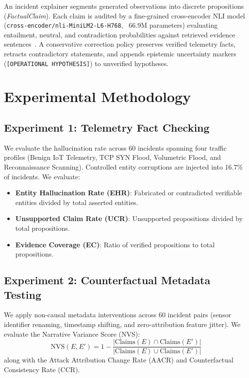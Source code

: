 \documentclass[conference]{IEEEtran}
\begin{document}
An incident explainer segments generated observations into discrete propositions (\textit{FactualClaim}). Each claim is audited by a fine-grained cross-encoder NLI model (\texttt{cross-encoder/nli-MiniLM2-L6-H768}, ~66.9M parameters) evaluating entailment, neutral, and contradiction probabilities against retrieved evidence sentences~\cite{thorne2018fever,devlin2019bert}. A conservative correction policy preserves verified telemetry facts, retracts contradictory statements, and appends epistemic uncertainty markers (\texttt{[OPERATIONAL HYPOTHESIS]}) to unverified hypotheses.

\section{Experimental Methodology}

\subsection{Experiment 1: Telemetry Fact Checking}
We evaluate the hallucination rate across 60 incidents spanning four traffic profiles (Benign IoT Telemetry, TCP SYN Flood, Volumetric Flood, and Reconnaissance Scanning). Controlled entity corruptions are injected into 16.7\% of incidents. We evaluate:
\begin{itemize}
    \item \textbf{Entity Hallucination Rate (EHR)}: Fabricated or contradicted verifiable entities divided by total asserted entities.
    \item \textbf{Unsupported Claim Rate (UCR)}: Unsupported propositions divided by total propositions.
    \item \textbf{Evidence Coverage (EC)}: Ratio of verified propositions to total propositions.
\end{itemize}

\subsection{Experiment 2: Counterfactual Metadata Testing}
We apply non-causal metadata interventions across 60 incident pairs (sensor identifier renaming, timestamp shifting, and zero-attribution feature jitter). We evaluate the Narrative Variance Score (NVS):
\begin{equation}
\text{NVS}(E, E') = 1 - \frac{|\text{Claims}(E) \cap \text{Claims}(E')|}{|\text{Claims}(E) \cup \text{Claims}(E')|}
\end{equation}
along with the Attack Attribution Change Rate (AACR) and Counterfactual Consistency Rate (CCR).
\end{document}
